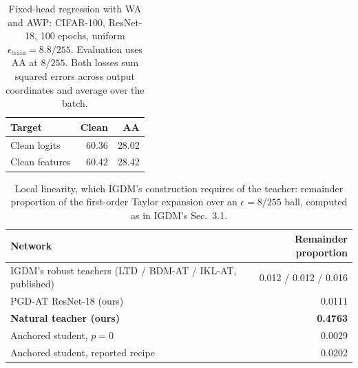 \begin{table}[!htbp]
  \centering \small \setlength{\tabcolsep}{6pt}
  \caption{Fixed-head regression with WA and AWP: CIFAR-100, ResNet-18, 100 epochs,
  uniform $\epsilon_{\mathrm{train}}=8.8/255$. Evaluation uses AA at $8/255$.
  Both losses sum squared errors across output coordinates and average over the batch.}
  \label{tab:regression_stack}
  \begin{tabular}{lrr}
    \toprule
    Target & Clean & AA \\
    \midrule
    Clean logits & 60.36 & 28.02 \\
    Clean features & 60.42 & 28.42 \\
    \bottomrule
  \end{tabular}
\end{table}

\begin{table}[!htbp]
  \centering \small \setlength{\tabcolsep}{4.5pt}
  \caption{Local linearity, which IGDM's construction requires of the teacher: remainder proportion of
  the first-order Taylor expansion over an $\epsilon=8/255$ ball, computed as in IGDM's Sec.~3.1.}
  \label{tab:linearity}
  \begin{tabular}{lr}
    \toprule
    Network & Remainder proportion \\
    \midrule
    IGDM's robust teachers (LTD / BDM-AT / IKL-AT, published) & 0.012 / 0.012 / 0.016 \\
    PGD-AT ResNet-18 (ours)          & 0.0111 \\
    \textbf{Natural teacher (ours)}  & \textbf{0.4763} \\
    Anchored student, $p=0$          & 0.0029 \\
    Anchored student, reported recipe & 0.0202 \\
    \bottomrule
  \end{tabular}
\end{table}

